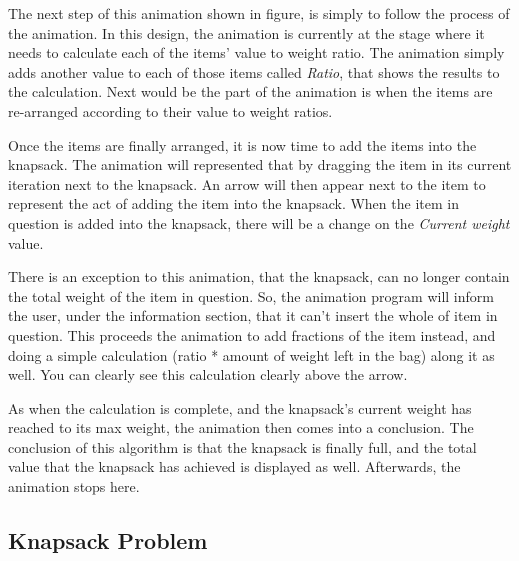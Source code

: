 The next step of this animation shown in figure, is simply to follow the process of the animation. In this design, the animation is currently at the stage where it needs to calculate each of the items' value to weight ratio. The animation simply adds another value to each of those items called \textit{Ratio}, that shows the results to the calculation. Next would be the part of the animation is when the items are re-arranged according to their value to weight ratios.

Once the items are finally arranged, it is now time to add the items into the knapsack. The animation will represented that by dragging the item in its current iteration next to the knapsack. An arrow will then appear next to the item to represent the act of adding the item into the knapsack. When the item in question is added into the knapsack, there will be a change on the \textit{Current weight} value. 

There is an exception to this animation, that the knapsack, can no longer contain the total weight of the item in question. So, the animation program will inform the user, under the information section, that it can't insert the whole of item in question. This proceeds the animation to add fractions of the item instead, and doing a simple calculation (ratio * amount of weight left in the bag) along it as well. You can clearly see this calculation clearly above the arrow.

As when the calculation is complete, and the knapsack's current weight has reached to its max weight, the animation then comes into a conclusion. The conclusion of this algorithm is that the knapsack is finally full, and the total value that the knapsack has achieved is displayed as well. Afterwards, the animation stops here. 

\newpage

\subsection{Knapsack Problem}


